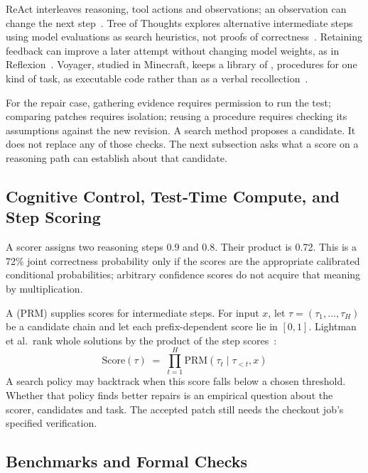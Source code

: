 ReAct interleaves reasoning, tool actions and observations; an observation can
change the next step~. Tree of Thoughts explores alternative
intermediate steps using model evaluations as search heuristics, not proofs
of correctness~. Retaining feedback can improve a later
attempt without changing model weights, as in Reflexion~.
Voyager, studied in Minecraft, keeps a library of ,
procedures for one kind of task, as executable code rather than as a verbal
recollection~.

For the repair case, gathering evidence requires permission to run the test;
comparing patches requires isolation; reusing a procedure requires checking
its assumptions against the new revision. A search method proposes a candidate.
It does not replace any of those checks. The next subsection asks what a score
on a reasoning path can establish about that candidate.

\subsection{Cognitive Control, Test-Time Compute, and Step Scoring}

A scorer assigns two reasoning steps 0.9 and 0.8. Their product is 0.72.
This is a 72\% joint correctness probability only if the scores are the
appropriate calibrated conditional probabilities; arbitrary confidence scores
do not acquire that meaning by multiplication.

A  (PRM) supplies scores for intermediate steps.
For input $x$, let $\tau=(\tau_1,\ldots,\tau_H)$ be a candidate chain and let each
prefix-dependent score lie in $[0,1]$. Lightman et al.\ rank whole solutions
by the product of the step scores~:
\begin{equation}
\mathrm{Score}(\tau) \;=\; \prod_{t=1}^H \mathrm{PRM}(\tau_t \mid \tau_{<t}, x)
\end{equation}
A search policy may backtrack when this score falls below a chosen threshold. Whether that policy finds better repairs is an empirical question about the scorer, candidates and task. The accepted patch still needs the checkout job's specified verification.

\subsection{Benchmarks and Formal Checks}

